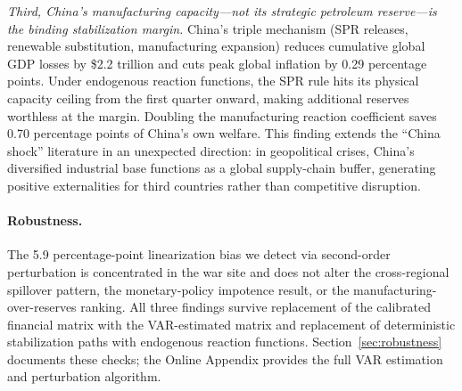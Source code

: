 \documentclass[12pt]{article}
\begin{document}
\textit{Third, China's manufacturing capacity---not its strategic petroleum reserve---is the binding stabilization margin.} China's triple mechanism (SPR releases, renewable substitution, manufacturing expansion) reduces cumulative global GDP losses by \$2.2 trillion and cuts peak global inflation by 0.29 percentage points. Under endogenous reaction functions, the SPR rule hits its physical capacity ceiling from the first quarter onward, making additional reserves worthless at the margin. Doubling the manufacturing reaction coefficient saves 0.70 percentage points of China's own welfare. This finding extends the ``China shock'' literature \citep{autor2013china} in an unexpected direction: in geopolitical crises, China's diversified industrial base functions as a global supply-chain buffer, generating positive externalities for third countries rather than competitive disruption.

\paragraph{Robustness.} The 5.9 percentage-point linearization bias we detect via second-order perturbation is concentrated in the war site and does not alter the cross-regional spillover pattern, the monetary-policy impotence result, or the manufacturing-over-reserves ranking. All three findings survive replacement of the calibrated financial matrix with the VAR-estimated matrix and replacement of deterministic stabilization paths with endogenous reaction functions. Section~\ref{sec:robustness} documents these checks; the Online Appendix provides the full VAR estimation and perturbation algorithm.
\end{document}

